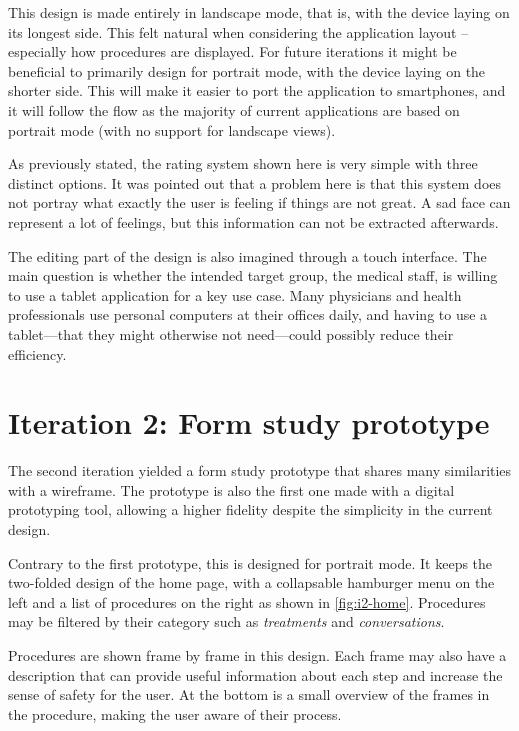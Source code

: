 This design is made entirely in landscape mode, that is, with the device laying on its longest side. This felt natural when considering the application layout -- especially how procedures are displayed. For future iterations it might be beneficial to primarily design for portrait mode, with the device laying on the shorter side. This will make it easier to port the application to smartphones, and it will follow the flow as the majority of current applications are based on portrait mode (with no support for landscape views).

As previously stated, the rating system shown here is very simple with three distinct options. It was pointed out that a problem here is that this system does not portray what exactly the user is feeling if things are not great. A sad face can represent a lot of feelings, but this information can not be extracted afterwards.

The editing part of the design is also imagined through a touch interface. The main question is whether the intended target group, the medical staff, is willing to use a tablet application for a key use case. Many physicians and health professionals use personal computers at their offices daily, and having to use a tablet---that they might otherwise not need---could possibly reduce their efficiency.

\section{Iteration 2: Form study prototype}
\label{sec:iteration2}

The second iteration yielded a form study prototype that shares many similarities with a wireframe. The prototype is also the first one made with a digital prototyping tool, allowing a higher fidelity despite the simplicity in the current design.

Contrary to the first prototype, this is designed for portrait mode. It keeps the two-folded design of the home page, with a collapsable hamburger menu on the left and a list of procedures on the right as shown in \autoref{fig:i2-home}. Procedures may be filtered by their category such as \emph{treatments} and \emph{conversations}.

Procedures are shown frame by frame in this design. Each frame may also have a description that can provide useful information about each step and increase the sense of safety for the user. At the bottom is a small overview of the frames in the procedure, making the user aware of their process.

